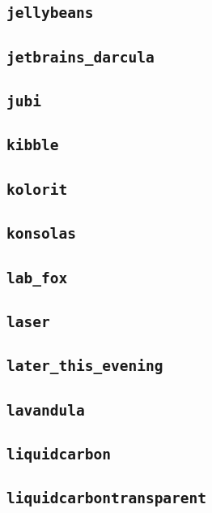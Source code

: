 \subsection{\texttt{jellybeans}}
\newpage
\subsection{\texttt{jetbrains\_darcula}}
\newpage
\subsection{\texttt{jubi}}
\newpage
\subsection{\texttt{kibble}}
\newpage
\subsection{\texttt{kolorit}}
\newpage
\subsection{\texttt{konsolas}}
\newpage
\subsection{\texttt{lab\_fox}}
\newpage
\subsection{\texttt{laser}}
\newpage
\subsection{\texttt{later\_this\_evening}}
\newpage
\subsection{\texttt{lavandula}}
\newpage
\subsection{\texttt{liquidcarbon}}
\newpage
\subsection{\texttt{liquidcarbontransparent}}
\newpage

